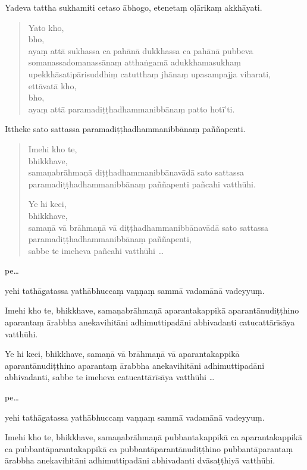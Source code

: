 \documentclass[11pt,twoside,openright]{book}
\begin{document}
\pstart
Yadeva tattha sukhamiti cetaso ābhogo, etenetaṃ oḷārikaṃ akkhāyati.
\pend

\begin{verse}
Yato kho,\\
\vin  bho,\\
\vin  ayaṃ attā sukhassa ca pahānā dukkhassa ca pahānā pubbeva somanassadomanassānaṃ atthaṅgamā adukkhamasukhaṃ upekkhāsatipārisuddhiṃ catutthaṃ jhānaṃ upasampajja viharati,\\
\vin  ettāvatā kho,\\
\vin  bho,\\
\vin  ayaṃ attā paramadiṭṭhadhammanibbānaṃ patto hotī’ti.

\end{verse}
\pstart
Ittheke sato sattassa paramadiṭṭhadhammanibbānaṃ paññapenti.
\pend

\begin{verse}
Imehi kho te,\\
\vin  bhikkhave,\\
\vin  samaṇabrāhmaṇā diṭṭhadhammanibbānavādā sato sattassa paramadiṭṭhadhammanibbānaṃ paññapenti pañcahi vatthūhi.

Ye hi keci,\\
\vin  bhikkhave,\\
\vin  samaṇā vā brāhmaṇā vā diṭṭhadhammanibbānavādā sato sattassa paramadiṭṭhadhammanibbānaṃ paññapenti,\\
\vin  sabbe te imeheva pañcahi vatthūhi …

\end{verse}
\pstart
pe…
\pend

\pstart
yehi tathāgatassa yathābhuccaṃ vaṇṇaṃ sammā vadamānā vadeyyuṃ.
\pend

\pstart
Imehi kho te, bhikkhave, samaṇabrāhmaṇā aparantakappikā aparantānudiṭṭhino aparantaṃ ārabbha anekavihitāni adhimuttipadāni abhivadanti catucattārīsāya vatthūhi.
\pend

\pstart
Ye hi keci, bhikkhave, samaṇā vā brāhmaṇā vā aparantakappikā aparantānudiṭṭhino aparantaṃ ārabbha anekavihitāni adhimuttipadāni abhivadanti, sabbe te imeheva catucattārīsāya vatthūhi …
\pend

\pstart
pe…
\pend

\pstart
yehi tathāgatassa yathābhuccaṃ vaṇṇaṃ sammā vadamānā vadeyyuṃ.
\pend

\pstart
Imehi kho te, bhikkhave, samaṇabrāhmaṇā pubbantakappikā ca aparantakappikā ca pubbantāparantakappikā ca pubbantāparantānudiṭṭhino pubbantāparantaṃ ārabbha anekavihitāni adhimuttipadāni abhivadanti dvāsaṭṭhiyā vatthūhi.
\pend
\end{document}
